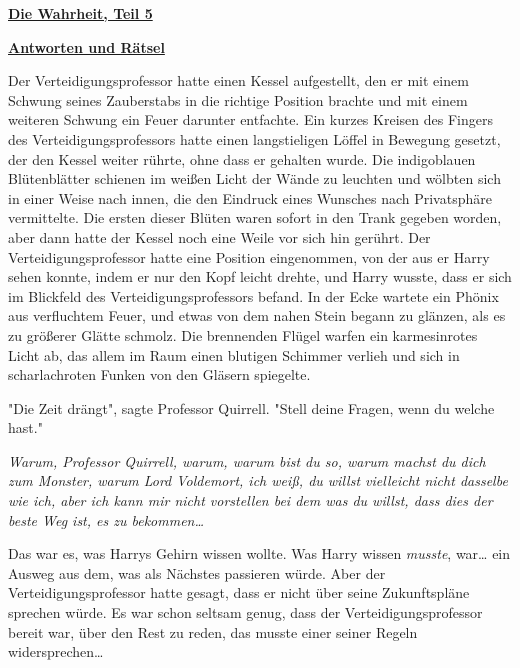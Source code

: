 

\hypertarget{die-wahrheit-teil-5}{%

\textbf{\uline{Die Wahrheit, Teil 5}}

\textbf{\uline{Antworten und Rätsel}}

Der Verteidigungsprofessor hatte einen Kessel aufgestellt, den er mit einem Schwung seines Zauberstabs in die richtige Position brachte und mit einem weiteren Schwung ein Feuer darunter entfachte. Ein kurzes Kreisen des Fingers des Verteidigungsprofessors hatte einen langstieligen Löffel in Bewegung gesetzt, der den Kessel weiter rührte, ohne dass er gehalten wurde. Die indigoblauen Blütenblätter schienen im weißen Licht der Wände zu leuchten und wölbten sich in einer Weise nach innen, die den Eindruck eines Wunsches nach Privatsphäre vermittelte. Die ersten dieser Blüten waren sofort in den Trank gegeben worden, aber dann hatte der Kessel noch eine Weile vor sich hin gerührt. Der Verteidigungsprofessor hatte eine Position eingenommen, von der aus er Harry sehen konnte, indem er nur den Kopf leicht drehte, und Harry wusste, dass er sich im Blickfeld des Verteidigungsprofessors befand. In der Ecke wartete ein Phönix aus verfluchtem Feuer, und etwas von dem nahen Stein begann zu glänzen, als es zu größerer Glätte schmolz. Die brennenden Flügel warfen ein karmesinrotes Licht ab, das allem im Raum einen blutigen Schimmer verlieh und sich in scharlachroten Funken von den Gläsern spiegelte.

"Die Zeit drängt", sagte Professor Quirrell. "Stell deine Fragen, wenn du welche hast."

\emph{Warum, Professor Quirrell, warum, warum bist du so, warum machst du dich zum Monster, warum Lord Voldemort, ich weiß, du willst vielleicht nicht dasselbe wie ich, aber ich kann mir nicht vorstellen bei dem was du willst, dass dies der beste Weg ist, es zu bekommen…}

Das war es, was Harrys Gehirn wissen wollte. Was Harry wissen \emph{musste}, war… ein Ausweg aus dem, was als Nächstes passieren würde. Aber der Verteidigungsprofessor hatte gesagt, dass er nicht über seine Zukunftspläne sprechen würde. Es war schon seltsam genug, dass der Verteidigungsprofessor bereit war, über den Rest zu reden, das musste einer seiner Regeln widersprechen…

}
